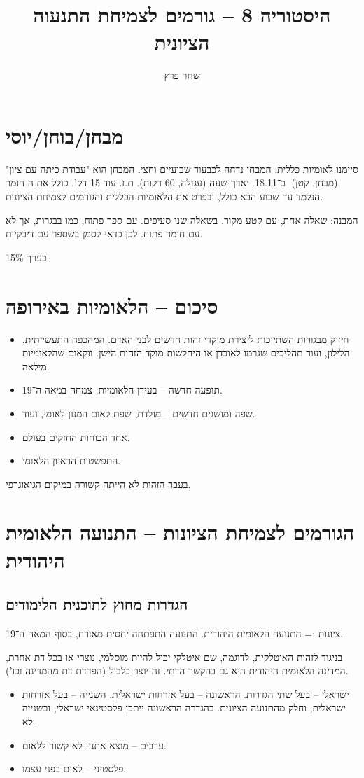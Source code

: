 \documentclass[]{article}
\author{שחר פרץ}
\title{היסטוריה 8 – גורמים לצמיחת התנעוה הציונית}
\begin{document}
	\maketitle
	\section{מבחן/בוחן/יוסי}
	סיימנו לאומיות כללית. המבחן נדחה לכבעוד שבועיים וחצי. המבחן הוא "עבודת כיתה עם ציון" (מבחן, קטן). ב־18.11. יארך שעה (עגולה, 60 דקות). ת.ז. עוד 15 דק'. כולל את ה חומר הנלמד עד שבוע הבא כולל, ובפרט את הלאומיות הכללית והגורמים לצמיחת הציונות.
	
	המבנה: שאלה אחת, עם קטע מקור. בשאלה שני סעיפים. עם ספר פתוח, כמו בבגרות, אך לא עם חומר פתוח. לכן כדאי לסמן בשספר עם דיבקיות. 
	
	בערך 15\%. 
	
	\section{סיכום – הלאומיות באירופה}
	\begin{itemize}
		\item חיזוק מבגורות השתייכות ליצירת מוקדי זהות חדשים לבני האדם. המהכפה התעשייתית, הלילון, ועוד תהליכים שגרמו לאובדן או היחלשות מוקד הזהות הישן. ווקאום שהלאומיות מילאה. 
		\item תופעה חדשה – בעידן הלאומיות. צמחה במאה ה־19. 
		\item שפה ומושגים חדשים – מולדת, שפת לאום המנון לאומי, ועוד. 
		\item אחד הכוחות החזקים בעולם. 
		\item התפשטות הראיון הלאומי. 
	\end{itemize}
	בעבר הזהות לא הייתה קשורה במיקום הגיאוגרפי. 
	\section{הגורמים לצמיחת הציונות – התנועה הלאומית היהודית}
	
	\subsection{הגדרות מחוץ לתוכנית הלימודים}
	ציונות := התנועה הלאומית היהודית. התנועה התפתחה יחסית מאורח, בסוף המאה ה־19. 
	
	בניגוד לזהות האיטלקית, לדוגמה, שם איטלקי יכול להיות מוסלמי, נוצרי או בכל דת אחרת, המדינה הלאומית היהודית היא גם בהקשר הדתי. זה יוצר בלבול (הפרדת דת מהמדינה וכו'). 
	
	\begin{itemize}
		\item ישראלי – בעל שתי הגדרות. הראשונה – בעל אזרחות ישראלית. השנייה – בעל אזרחות ישראלית, וחלק מהתנועה הציונית. בהגדרה הראשונה ייתכן פלסטינאי ישראלי, ובשנייה לא. 
		\item ערבים – מוצא אתני. לא קשור ללאום. 
		\item פלסטיני – לאום בפני עצמו. 
	\end{itemize}
	
\end{document}
